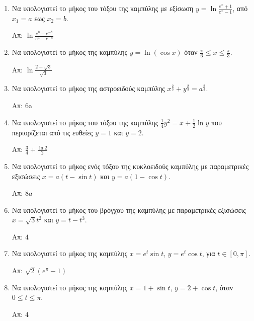 


\everymath{\displaystyle}
\pagestyle{askhseis}



\begin{center}
  \minibox{\large\bfseries \textcolor{Col1}{Μήκος Καμπύλης}}
\end{center}

\vspace{\baselineskip}

\begin{enumerate}

	\item Να υπολογιστεί το μήκος του τόξου της καμπύλης με εξίσωση $ y =
		\ln{\frac{e^{x} + 1}{e^{x} - 1}}$, από $ x_{1} = a $ εως $ x_{2} = b $.

		\hfill Απ: $ \ln{\frac{e^{b} - e^{-b}}{e^{a} - e^{-a}}} $

	\item Να υπολογιστεί το μήκος της καμπύλης $y=\ln(\cos x)$ όταν 
        $\frac{\pi}{6}\leq x \leq \frac{\pi}{3}$.

		\hfill Απ: $\ln\frac{2+\sqrt{3}}{\sqrt{3}}$

	\item Να υπολογιστεί το μήκος της αστροειδούς καμπύλης $ x^{\frac{2}{3}}
		+ y^{\frac{2}{3}} = a^{\frac{2}{3}} $.

		\hfill Απ: 6a

	\item Να υπολογιστεί το μήκος του τόξου της καμπύλης $ \frac{1}{4} y^{2} = x +
		\frac{1}{2} \ln{y} $ που περιορίζεται από τις ευθείες $ y = 1 $ και $ y =
		2$.

		\hfill Απ: $ \frac{3}{4} + \frac{\ln{2}}{2} $

    \item Να υπολογιστεί το μήκος ενός τόξου της κυκλοειδούς καμπύλης με παραμετρικές 
        εξισώσεις $ x = a(t - \sin{t}) $ και $ y = a(1- \cos{t}) $.

        \hfill Απ: $ 8a $ 

    \item Να υπολογιστεί το μήκος του βρόγχου της καμπύλης με παραμετρικές εξισώσεις 
        $ x= \sqrt{3} t^{2} $ και $ y = t - t^{3} $.

        \hfill Απ: $ 4 $ 

	\item Να υπολογιστεί το μήκος της καμπύλης $ x = e^{t} \sin{t} $, $ y = e^{t}
		\cos{t} $, για $ t \in [0, \pi] $.

		\hfill Απ: $ \sqrt{2} (e^{\pi} - 1)  $

	\item Να υπολογιστεί το μήκος της καμπύλης $x=1+\sin t$, $y=2+\cos t$, όταν 
        $0\leq t\leq \pi$.

		\hfill Απ: $4$

\end{enumerate}




